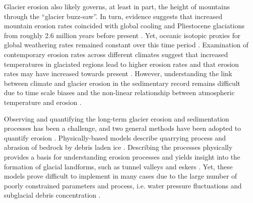 \documentclass[esurf, manuscript]{copernicus}
\begin{document}
    Glacier erosion also likely governs, at least in part,
    the height of mountains \citep{Egholm.etal.2009,Thomson.etal.2010} through
    the ``glacier buzz-saw''. In turn, evidence suggests that increased
    mountain erosion rates coincided with global cooling and Pliestocene
    glaciations from roughly 2.6 million years before present
    \citep{Herman.Champagnac.2016}. Yet, oceanic isotopic proxies for global
    weathering rates remained constant over this time period
    \citep{Willenbring.Von-Blanckenburg.2010}. Examination of contemporary
    erosion rates across different climates suggest that increased temperatures
    in glaciated regions lead to higher erosion rates and that erosion rates
    may have increased towards present \citep{Koppes.Montgomery.2009,
    Koppes.etal.2015, Fernandez.etal.2016}. However, understanding the link
    between climate and glacier erosion in the sedimentary record remains
    difficult due to time scale biases \citep{Ganti.etal.2016} and the
    non-linear relationship  between atmospheric temperature and erosion
    \citep[e.g.,][]{Anderson.etal.2012,Mariotti.etal.2021}.

    Observing and quantifying the long-term glacier erosion and sedimentation
    processes has been a challenge, and two general methods have been adopted
    to quantify erosion \citep{Alley.etal.2019}. Physically-based models
    describe quarrying process and abrasion of bedrock by debris laden ice
    \citep[e.g.,][]{Alley.etal.1997, Iverson.2012, Beaud.etal.2014}. Describing
    the processes physically provides a basis for understanding erosion
    processes \citep{Hallet.1979, Ugelvig.etal.2018} and yields insight into
    the formation of glacial landforms, such as tunnel valleys and eskers
    \citep{Beaud.etal.2018, Hewitt.Creyts.2019}. Yet, these models prove
    difficult to implement in many cases due to the large number of poorly
    constrained parameters and process, i.e. water pressure fluctuations and
    subglacial debris concentration \citep[e.g.,][]{Hallet.1979, Seguinot.2008,
    Ugelvig.etal.2018}.
\end{document}
